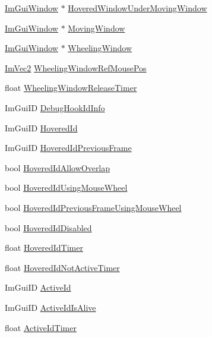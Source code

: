 \begin{DoxyCompactItemize}
\item 
\hyperlink{structImGuiWindow}{Im\+Gui\+Window} $\ast$ \hyperlink{structImGuiContext_ace3d84fd6e57f608eb90d7bc0b928cf5}{Hovered\+Window\+Under\+Moving\+Window}
\item 
\hyperlink{structImGuiWindow}{Im\+Gui\+Window} $\ast$ \hyperlink{structImGuiContext_a28078cc22f615213fd8544016cd6ae20}{Moving\+Window}
\item 
\hyperlink{structImGuiWindow}{Im\+Gui\+Window} $\ast$ \hyperlink{structImGuiContext_a30c249bb99dd335b71b437e9240cfcb2}{Wheeling\+Window}
\item 
\hyperlink{structImVec2}{Im\+Vec2} \hyperlink{structImGuiContext_ae9d2a8e67d3518f7170495fa2eef9f08}{Wheeling\+Window\+Ref\+Mouse\+Pos}
\item 
float \hyperlink{structImGuiContext_a38b81373d35b6e0afc4d5954e87fc544}{Wheeling\+Window\+Release\+Timer}
\item 
Im\+Gui\+ID \hyperlink{structImGuiContext_a07b7e4db124eaf368cf52dedee426fe1}{Debug\+Hook\+Id\+Info}
\item 
Im\+Gui\+ID \hyperlink{structImGuiContext_a32bef5a7740179ad8076643b001f15e4}{Hovered\+Id}
\item 
Im\+Gui\+ID \hyperlink{structImGuiContext_a08742c14087e26304ff47fb9212d8eb6}{Hovered\+Id\+Previous\+Frame}
\item 
bool \hyperlink{structImGuiContext_a171f67ac705994d413a0bccf491aa4e1}{Hovered\+Id\+Allow\+Overlap}
\item 
bool \hyperlink{structImGuiContext_a6eef87012f6162b74eba1adfb3b3bc12}{Hovered\+Id\+Using\+Mouse\+Wheel}
\item 
bool \hyperlink{structImGuiContext_a82fd6bea3b303ee8aa341040759750dd}{Hovered\+Id\+Previous\+Frame\+Using\+Mouse\+Wheel}
\item 
bool \hyperlink{structImGuiContext_a5d969e8f2ff39c038893e15e3e4f216f}{Hovered\+Id\+Disabled}
\item 
float \hyperlink{structImGuiContext_a07a6bd929503077394ea0f80965470f9}{Hovered\+Id\+Timer}
\item 
float \hyperlink{structImGuiContext_ac2d1b0663e1ece41f9347fb299789b32}{Hovered\+Id\+Not\+Active\+Timer}
\item 
Im\+Gui\+ID \hyperlink{structImGuiContext_a11c874eb6cf74ba9162bd1d01c4ccbcc}{Active\+Id}
\item 
Im\+Gui\+ID \hyperlink{structImGuiContext_a91563e660064da31449958c97f70ceb0}{Active\+Id\+Is\+Alive}
\item 
float \hyperlink{structImGuiContext_a9deb2b22abfb5a4fd306371b19e2b9c4}{Active\+Id\+Timer}

\end{DoxyCompactItemize}
